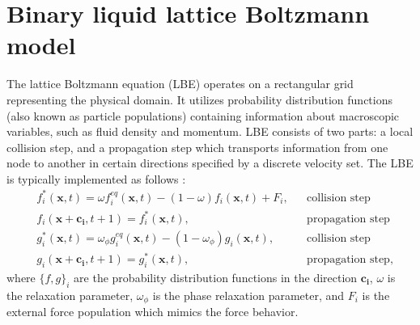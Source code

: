 \documentclass[preprint,12pt]{elsarticle}
\begin{document}
\section{Binary liquid lattice Boltzmann model}
The lattice Boltzmann equation (LBE) operates on a rectangular grid representing the
physical domain. It utilizes
probability distribution functions (also known as particle populations)
containing information about
macroscopic variables, such as fluid density and momentum. LBE consists of
two parts: a local collision step, and a propagation step which transports
information from one node to another in certain
directions specified by a discrete velocity set.
The LBE is typically implemented as follows \cite{ginzburg-boundary-main}:
\begin{equation}
\label{standard:implementation}
\begin{aligned}
&f_i^{*}(\bm{x},t)=\omega f_i^{eq}(\bm{x},t)-(1-\omega) f_i(\bm{x},t) +
F_i,&&\text{collision step}\\
&f_i(\bm{x}+\bm{c_i},t+1)=f_i^{*}(\bm{x},t),&&\text{propagation step}\\
&g_i^{*}(\bm{x},t)=\omega_{\phi} g_i^{eq}(\bm{x},t)-(1-\omega_{\phi})
g_i(\bm{x},t),&&\text{collision step}\\
&g_i(\bm{x}+\bm{c_i},t+1)=g_i^{*}(\bm{x},t),&&\text{propagation step},
\end{aligned}
\end{equation}
where $\{f,g\}_i$ are the probability distribution functions in the direction $\bm{c_i}$, $\omega$
is the
relaxation parameter, $\omega_{\phi}$ is the phase relaxation parameter, and $F_i$ is the external
force population which
mimics the force behavior.
\end{document}
